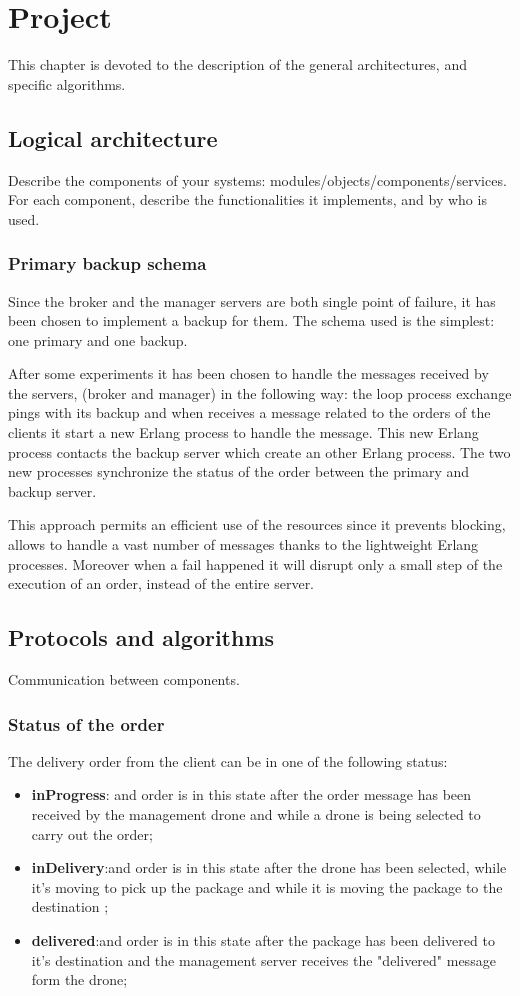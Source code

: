 \documentclass[a4paper, oneside]{memoir}
\begin{document}
\chapter{Project}

This chapter is devoted to the description of the general architectures, and specific algorithms.

\section{Logical architecture}
Describe the components of your systems: modules/objects/components/services.
For each component, describe the functionalities it implements, and by who is used.

\subsection{Primary backup schema}
Since the broker and the manager servers are both single point of failure, it has been chosen to implement a backup for them. The schema used is the simplest: one primary and one backup.

After some experiments it has been chosen to handle the messages received by the servers, (broker and manager) in the following way: the loop process exchange pings with its backup and when receives a message related to the orders of the clients it start a new Erlang process to handle the message. This new Erlang process contacts the backup server which create an other Erlang process. The two new processes synchronize the status of the order between the primary and backup server.

This approach permits an efficient use of the resources since it prevents blocking, allows to handle a vast number of messages thanks to the lightweight Erlang processes. Moreover when a fail happened it will disrupt only a small step of the execution of an order, instead of the entire server.


\section{Protocols and algorithms}
Communication between components.

\subsection{Status of the order}
The delivery order from the client can be in one of the following status:
\begin{itemize}
\item \textbf{inProgress}: and order is in this state after the order message has been received by the management drone and while a drone is being selected to carry out the order;
\item \textbf{inDelivery}:and order is in this state after the drone has been selected, while it's moving to pick up the package and while it is moving the package to the destination ;
\item \textbf{delivered}:and order is in this state after the package has been delivered to it's destination and the management server receives the "delivered" message form the drone;
\end{itemize}
\end{document}
